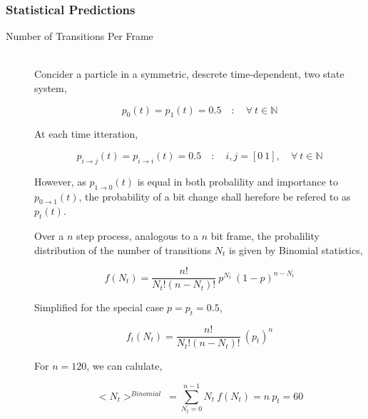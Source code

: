 		\subsubsection{Statistical Predictions} %
		\label{subsub:statistical_predictions}

			\begin{description}
				\item[Number of Transitions Per Frame] \hfill \\
					
					Concider a particle in a symmetric, descrete time-dependent, two state system,

					\begin{equation}
						p_0(t) = p_1(t) = 0.5 \quad : \quad \forall\ t \in \mathbb{N}
					\end{equation}

					At each time itteration,

					\begin{equation}
						p_{i \to j}(t) = p_{i \to i}(t) = 0.5 \quad : \quad i,j = [0\ 1], \quad \forall\ t \in \mathbb{N}
					\end{equation}

					However, as $p_{1 \to 0}(t)$ is equal in both probalility and importance to $p_{0 \to 1}(t)$, the probability of a bit change shall herefore be refered to as $p_{t}(t)$.
					\par
					Over a $n$ step process, analogous to a $n$ bit frame, the probalility distribution of the number of transitions $N_t$ is given by Binomial statistics,

					\begin{equation}
						f(N_{t}) = \frac{n!}{N_{t}!(n-N_{t})!}\ p^{N_{t}}\ (1 - p)^{n-N_{t}}
					\end{equation}

					Simplified for the special case $p = p_{t} = 0.5$,

					\begin{equation}
						f_{t}(N_{t}) = \frac{n!}{N_{t}!(n-N_{t})!}\ (p_{t})^{n}
						\label{eqn:transition_propability_dencity}
					\end{equation}

					For $n = 120$, we can calulate,

					\begin{equation}
						<N_t>^{Binomial} \ = \sum_{N_{t}=0}^{n-1} N_{t}\ f(N_{t}) = n\ p_{t} = 60
						\label{eqn:tansition_expectation}
					\end{equation}


\end{description}
